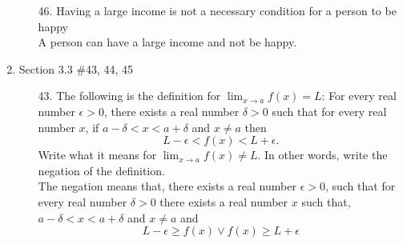 \documentclass[12pt]{article}
\begin{document}
\begin{enumerate}
\begin{enumerate}
                \item[46.]Having a large income is not a necessary condition for a person to be happy\\
                A person can have a large income and not be happy.
                    
                
                      
            \end{enumerate}

            
        \newpage
        \item Section 3.3 \#43, 44, 45
            \begin{enumerate}
                \item[43.]The following is the definition for \(\lim_{x \to a} f(x) = L\): For every real number \(\epsilon > 0\), there exists a real number \(\delta > 0\) such that for every real number \(x\), if \(a - \delta < x < a + \delta\) and \(x \neq a\) then
                \[
                L - \epsilon < f(x) < L + \epsilon.
                \]
                Write what it means for \(\lim_{x \to a} f(x) \neq L\). In other words, write the negation of the definition.\\
                The negation means that,  there exists a real number $\epsilon > 0$, such that for every real number $\delta >0$ there exists a real number $x$ such that,  $a-\delta < x < a + \delta $ and $x \neq a$ and
                \[
                L- \epsilon \geq f(x) \vee f(x) \geq L+\epsilon 
                \]


\end{enumerate}
\end{enumerate}
\end{document}

